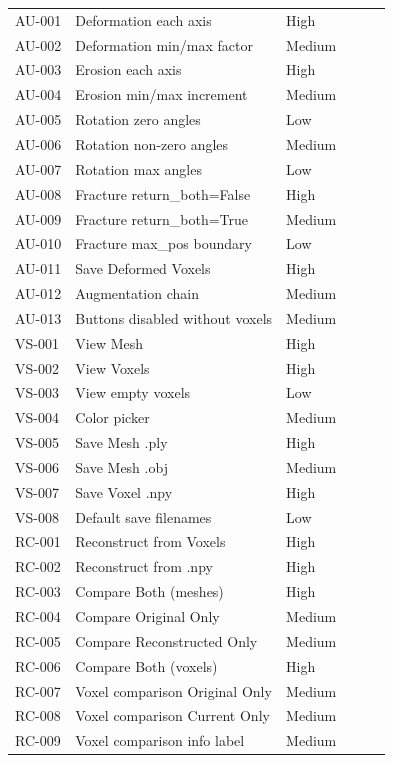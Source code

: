 \documentclass[12pt,a4paper]{article}
\begin{document}
\begin{longtable}{p{1.2cm}p{5.5cm}p{1.5cm}p{1.5cm}p{1.5cm}p{2cm}}
\addlinespace
AU-001 & Deformation each axis & High & & & \\
AU-002 & Deformation min/max factor & Medium & & & \\
AU-003 & Erosion each axis & High & & & \\
AU-004 & Erosion min/max increment & Medium & & & \\
AU-005 & Rotation zero angles & Low & & & \\
AU-006 & Rotation non-zero angles & Medium & & & \\
AU-007 & Rotation max angles & Low & & & \\
AU-008 & Fracture return\_both=False & High & & & \\
AU-009 & Fracture return\_both=True & Medium & & & \\
AU-010 & Fracture max\_pos boundary & Low & & & \\
AU-011 & Save Deformed Voxels & High & & & \\
AU-012 & Augmentation chain & Medium & & & \\
AU-013 & Buttons disabled without voxels & Medium & & & \\
\addlinespace
VS-001 & View Mesh & High & & & \\
VS-002 & View Voxels & High & & & \\
VS-003 & View empty voxels & Low & & & \\
VS-004 & Color picker & Medium & & & \\
VS-005 & Save Mesh .ply & High & & & \\
VS-006 & Save Mesh .obj & Medium & & & \\
VS-007 & Save Voxel .npy & High & & & \\
VS-008 & Default save filenames & Low & & & \\
\addlinespace
RC-001 & Reconstruct from Voxels & High & & & \\
RC-002 & Reconstruct from .npy & High & & & \\
RC-003 & Compare Both (meshes) & High & & & \\
RC-004 & Compare Original Only & Medium & & & \\
RC-005 & Compare Reconstructed Only & Medium & & & \\
RC-006 & Compare Both (voxels) & High & & & \\
RC-007 & Voxel comparison Original Only & Medium & & & \\
RC-008 & Voxel comparison Current Only & Medium & & & \\
RC-009 & Voxel comparison info label & Medium & & & \\

\end{longtable}
\end{document}
